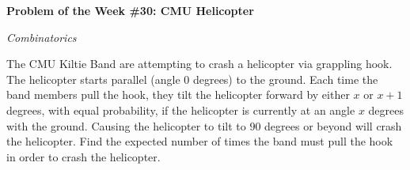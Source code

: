 \begin{potw}\vspace{5pt}
{\large\textbf{Problem of the Week \#30: CMU Helicopter}}\vspace{5pt}

\textit{Combinatorics}\V

The CMU Kiltie Band are attempting to crash a helicopter via grappling hook. The helicopter starts parallel (angle $0$ degrees) to the ground. Each time the band members pull the hook, they tilt the helicopter forward by either $x$ or $x + 1$ degrees, with equal probability, if the helicopter is
currently at an angle $x$ degrees with the ground. Causing the helicopter to tilt to $90$ degrees or beyond will crash the helicopter. Find the expected number of times the band must pull the hook in order to crash the helicopter.
\end{potw}\V

